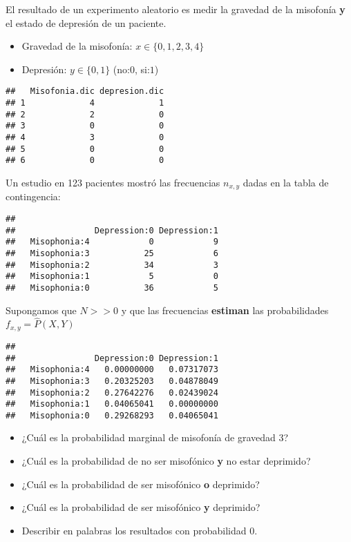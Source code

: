 \documentclass[
]{book}
\providecommand{\tightlist}{%
  \setlength{\itemsep}{0pt}\setlength{\parskip}{0pt}}
\begin{document}
El resultado de un experimento aleatorio es medir la gravedad de la misofonía \textbf{y} el estado de depresión de un paciente.

\begin{itemize}
\tightlist
\item
  Gravedad de la misofonía: \(x\in \{0,1,2,3,4\}\)
\item
  Depresión: \(y\in \{0,1\}\) (no:\(0\), si:\(1\))
\end{itemize}

\begin{verbatim}
##   Misofonia.dic depresion.dic
## 1             4             1
## 2             2             0
## 3             0             0
## 4             3             0
## 5             0             0
## 6             0             0
\end{verbatim}

Un estudio en 123 pacientes mostró las frecuencias \(n_{x,y}\) dadas en la tabla de contingencia:

\begin{verbatim}
##               
##                Depression:0 Depression:1
##   Misophonia:4            0            9
##   Misophonia:3           25            6
##   Misophonia:2           34            3
##   Misophonia:1            5            0
##   Misophonia:0           36            5
\end{verbatim}

Supongamos que \(N>>0\) y que las frecuencias \textbf{estiman} las probabilidades \(f_{x,y}=\hat{P}(X, Y)\)

\begin{verbatim}
##               
##                Depression:0 Depression:1
##   Misophonia:4   0.00000000   0.07317073
##   Misophonia:3   0.20325203   0.04878049
##   Misophonia:2   0.27642276   0.02439024
##   Misophonia:1   0.04065041   0.00000000
##   Misophonia:0   0.29268293   0.04065041
\end{verbatim}

\begin{itemize}
\tightlist
\item
  ¿Cuál es la probabilidad marginal de misofonía de gravedad 3?
\item
  ¿Cuál es la probabilidad de no ser misofónico \textbf{y} no estar deprimido?
\item
  ¿Cuál es la probabilidad de ser misofónico \textbf{o} deprimido?
\item
  ¿Cuál es la probabilidad de ser misofónico \textbf{y} deprimido?
\item
  Describir en palabras los resultados con probabilidad 0.
\end{itemize}
\end{document}

